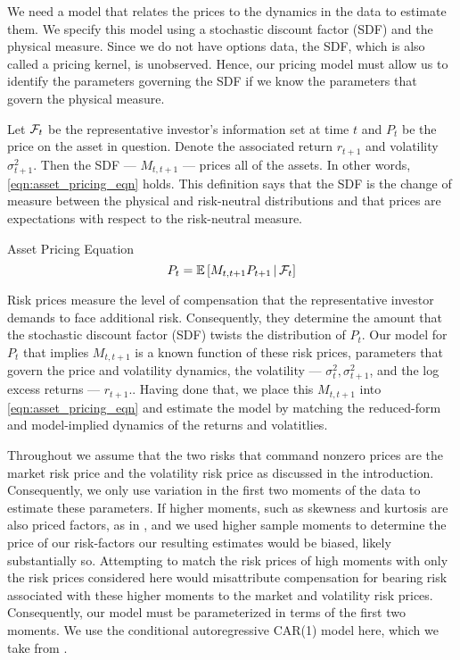 \documentclass[11pt, letterpaper, twoside]{article}
\begin{document}
We need a model that relates the prices to the dynamics in the data to estimate them.  We specify this model using a  stochastic discount factor (SDF) and the physical measure. Since we do not have options data, the SDF, which is also called a pricing kernel, is unobserved. Hence, our pricing model must allow us to identify the parameters governing the  SDF  if we know the parameters that govern the physical measure. 

Let $\mathcal{F}_t$ be the representative investor's information set at time $t$ and $P_t$ be the price on the asset in question. Denote the associated return $r_{t+1}$ and volatility $\sigma^2_{t+1}$. Then the SDF --- $M_{t,t+1}$ --- prices all of the assets. In other words, \cref{eqn:asset_pricing_eqn}  holds. This definition says that the SDF is the change of measure between the physical and risk-neutral distributions and that prices are expectations with respect to the risk-neutral measure.

\begin{defn}{Asset Pricing Equation}
    \label{eqn:asset_pricing_eqn}
    \begin{equation}
        P_t = \operatorname{\mathbb{E}}\left[M_{t,t+1} P_{t+1} \,\middle\vert\, \mathcal{F}_t \right] 
    \end{equation}
\end{defn}

Risk prices measure the level of compensation that the representative investor demands to face additional risk. Consequently, they determine the amount that the stochastic discount factor (SDF) twists the distribution of $P_t$.  Our model for $P_t$ that implies $M_{t,t+1}$ is a known function of these risk prices, parameters that govern the price and volatility dynamics, the volatility --- $\sigma^2_{t}, \sigma^2_{t+1}$, and the log excess returns --- $r_{t+1}$.. Having done that, we place this $M_{t,t+1}$ into \cref{eqn:asset_pricing_eqn} and estimate the model by matching the reduced-form and model-implied dynamics of the returns and volatitlies.

Throughout we assume that the two risks that command nonzero prices are the market risk price and the volatility risk price as discussed in the introduction. Consequently, we  only use variation in the first two moments of the data to estimate these parameters. If higher moments, such as skewness and kurtosis are also priced factors, as in \textcites{harvey2000conditional, conrad2012exante, chang2013market}, and we used higher sample moments to determine the price of our risk-factors our resulting estimates would be biased, likely substantially so.  Attempting to match the risk prices of high moments with only the risk prices considered here would misattribute compensation for bearing risk associated with these higher moments to the market and volatility risk prices.  Consequently, our model must be parameterized in terms of the first two moments. We use the conditional autoregressive CAR(1) model here, which we take from \textcite{darolles2006structural,han2018leverage}. 
\end{document}
